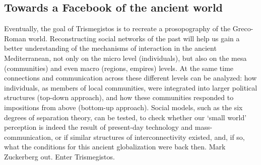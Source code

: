 \documentclass[amsthm,ebook]{saparticle}
\begin{document}
\subsection{Towards a Facebook of the ancient world}


\noindent Eventually, the goal of Trismegistos is to recreate a prosopography of the Greco-Roman world. Reconstructing social
networks of the past will help us gain a better understanding of the mechanisms of interaction in the ancient
Mediterranean, not only on the micro level (individuals), but also on the mesa (communities) and even macro (regions,
empires) levels. At the same time connections and communication across these different levels can be analyzed: how
individuals, as members of local communities, were integrated into larger political structures (top-down approach), and
how these communities responded to impositions from above (bottom-up approach). Social models, such as the six degrees
of separation theory, can be tested, to check whether our `small world' perception is indeed the result of present-day
technology and mass-communication, or if similar structures of interconnectivity existed, and, if so, what the
conditions for this ancient globalization were back then. Mark Zuckerberg out. Enter Trismegistos. 




\end{document}
